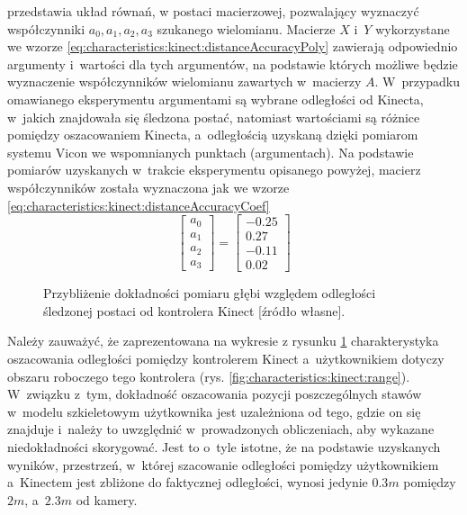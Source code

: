 przedstawia układ równań, w postaci macierzowej, pozwalający wyznaczyć współczynniki $a_0 ,a_1, a_2, a_3$ szukanego wielomianu. Macierze $X$ i~$Y$ wykorzystane we wzorze \ref{eq:characteristics:kinect:distanceAccuracyPoly} zawierają odpowiednio argumenty i~wartości dla tych argumentów, na podstawie których możliwe będzie wyznaczenie współczynników wielomianu zawartych w~macierzy $A$. W~przypadku omawianego eksperymentu argumentami są wybrane odległości od Kinecta, w~jakich znajdowała się śledzona postać, natomiast wartościami są różnice pomiędzy oszacowaniem Kinecta, a~odległością uzyskaną dzięki pomiarom systemu Vicon we wspomnianych punktach (argumentach). Na podstawie pomiarów uzyskanych w~trakcie eksperymentu opisanego powyżej, macierz współczynników została wyznaczona jak we wzorze \ref{eq:characteristics:kinect:distanceAccuracyCoef}
\begin{equation}
	\label{eq:characteristics:kinect:distanceAccuracyCoef}
	\begin{bmatrix}
		a_0 \\a_1\\a_2\\a_3
	\end{bmatrix} = 
	\begin{bmatrix}
		- 0.25 \\  0.27 \\- 0.11\\0.02		
	\end{bmatrix}	
\end{equation}
																																							
\pgfplotsset{width=12cm,compat=1.8}
																																							
\begin{savenotes}
	\begin{figure}[!htb]
		\centering
		
																																																														
		\caption[Przybliżenie dokładności pomiaru głębi względem odległości śledzonej postaci od kontrolera Kinect]{Przybliżenie dokładności pomiaru głębi względem odległości śledzonej postaci od kontrolera Kinect [źródło własne].}
		\label{fig:characteristics:kinect:distanceAccuracy}
	\end{figure}
\end{savenotes}
																																									
Należy zauważyć, że zaprezentowana na wykresie z rysunku \ref{fig:characteristics:kinect:distanceAccuracy} charakterystyka oszacowania odległości pomiędzy kontrolerem Kinect a~użytkownikiem dotyczy obszaru roboczego tego kontrolera (rys. \ref{fig:characteristics:kinect:range}). W~związku z~tym, dokładność oszacowania pozycji poszczególnych stawów w~modelu szkieletowym użytkownika jest uzależniona od tego, gdzie on się znajduje i~należy to uwzględnić w~prowadzonych obliczeniach, aby wykazane niedokładności skorygować. Jest to o~tyle istotne, że na podstawie uzyskanych wyników, przestrzeń, w~której szacowanie odległości pomiędzy użytkownikiem a~Kinectem jest zbliżone do faktycznej odległości, wynosi jedynie $0.3m$ pomiędzy $2m$, a~$2.3m$ od kamery.  
																																							
